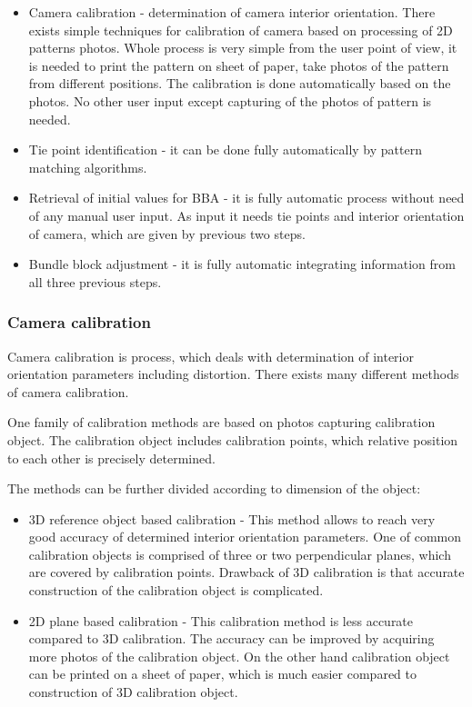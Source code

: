 \documentclass[a4paper,12pt]{article}
\begin{document}
\begin{itemize}
\item Camera calibration - determination of camera interior orientation. There exists simple techniques for calibration
of camera based on processing of 2D patterns photos. Whole process is very simple from the user point of view, it is needed 
to print the pattern on sheet of paper, take photos of the pattern from different positions. The calibration 
is done automatically based on the photos. No other user input except  capturing of the photos of pattern is needed.
\item Tie point identification - it can be done fully automatically by pattern matching algorithms.
\item Retrieval of initial values for BBA - it is fully automatic process without need of any manual user input.
As input it needs tie points and interior orientation of camera, which are given by previous two steps.
\item Bundle block adjustment - it is fully automatic integrating information from all three previous steps.
\end{itemize}

 
\subsubsection{Camera calibration}

Camera calibration is process, which deals with determination of interior orientation parameters including distortion.
There exists many different methods of camera calibration.

One family of calibration methods are based on photos capturing calibration object.
The calibration object includes calibration points, which relative position to each other is  precisely determined.  

The methods can be further divided according to dimension of the object:
\begin{itemize}
\item 3D reference object based calibration - This method allows to reach very good accuracy of determined 
interior orientation parameters. One of common calibration objects is comprised of three or two
perpendicular planes, which are covered by calibration points. Drawback of 3D calibration 
is that accurate construction of the calibration object is complicated.
\item 2D plane based calibration - This calibration method is less accurate compared to 3D calibration. 
The accuracy can be improved by acquiring more photos of the calibration object.
On the other hand calibration object can be printed on a sheet of paper, which is much 
easier compared to construction of 3D calibration object.
\end{itemize}
\end{document}
